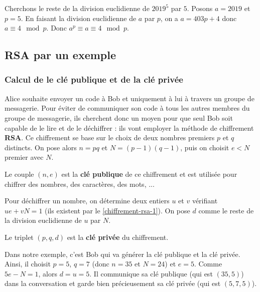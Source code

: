   \begin{example}
    Cherchons le reste de la division euclidienne de $2019^5$ par $5$.
    \newpar
    Posons $a = 2019$ et $p = 5$. En faisant la division euclidienne de $a$ par $p$, on a $a = 403p + 4$ donc $a \equiv 4 \mod p$. Donc $a^p \equiv a \equiv 4 \mod p$.
  \end{example}

  \subsection{RSA par un exemple}

  \subsubsection{Calcul de le clé publique et de la clé privée}

  Alice souhaite envoyer un code à Bob et uniquement à lui à travers un groupe de messagerie. Pour éviter de communiquer son code à tous les autres membres du groupe de messagerie, ils cherchent donc un moyen pour que seul Bob soit capable de le lire et de le déchiffrer : ils vont employer la méthode de chiffrement \textbf{RSA}.
  \newpar
  Ce chiffrement se base sur le choix de deux nombres premiers $p$ et $q$ distincts. On pose alors $n = pq$ et $N = (p-1)(q-1)$, puis on choisit $e < N$ premier avec $N$.

  \begin{definition}
    Le couple $(n, e)$ est la \textbf{clé publique} de ce chiffrement et est utilisée pour chiffrer des nombres, des caractères, des mots, ...
  \end{definition}

  Pour déchiffrer un nombre, on détermine deux entiers $u$ et $v$ vérifiant $ue + vN = 1$ (ils existent par le \cref{chiffrement-rsa-1}). On pose $d$ comme le reste de la division euclidienne de $u$ par $N$.

  \begin{definition}
    Le triplet $(p, q, d)$ est la \textbf{clé privée} du chiffrement.
  \end{definition}

  Dans notre exemple, c'est Bob qui va générer la clé publique et la clé privée. Ainsi, il choisit $p = 5$, $q = 7$ (donc $n = 35$ et $N = 24$) et $e = 5$. Comme $5e - N = 1$, alors $d = u = 5$.
  \newpar
  Il communique sa clé publique (qui est $(35, 5)$) dans la conversation et garde bien précieusement sa clé privée (qui est $(5, 7, 5)$).

